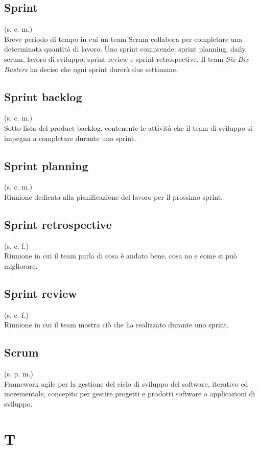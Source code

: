     \subsection{Sprint}
    \label{Sprint}
    (s. c. m.)\\
    Breve periodo di tempo in cui un team Scrum collabora per completare 
    una determinata quantità di lavoro. Uno sprint comprende:  
    sprint planning, daily scrum, lavoro di sviluppo, 
    sprint review e sprint retrospective. Il team \textit{Six Bix Busters} ha 
    deciso che ogni sprint durerà due settimane.
    \subsection{Sprint backlog}   
    \label{Sprint backlog}
    (s. c. m.)\\
    Sotto-lista del product backlog, contenente le attività che il team di sviluppo 
    si impegna a completare durante uno sprint.
    \subsection{Sprint planning}
    (s. c. m.)\\
    Riunione dedicata alla pianificazione del lavoro per il prossimo sprint. 
    \subsection{Sprint retrospective}
    \label{Sprint retrospective}
    (s. c. f.)\\
    Riunione in cui il team parla di cosa è andato bene, cosa no e come si può migliorare.
    \subsection{Sprint review}
    (s. c. f.)\\ 
    Riunione in cui il team mostra ciò che ha realizzato durante uno sprint.
    \subsection{Scrum}
    (s. p. m.)\\
    Framework agile per la gestione del ciclo di sviluppo del software, 
    iterativo ed incrementale, concepito per gestire progetti e prodotti software 
    o applicazioni di sviluppo.

\pagebreak
\section{T}
